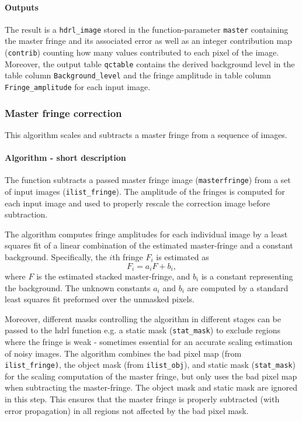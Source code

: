 \paragraph{Outputs}
\label{fringe:algorithms:compute:outputs}

The result is a \verb+hdrl_image+ stored in the function-parameter
\verb+master+ containing the master fringe and its associated error as
well as an integer contribution map (\verb+contrib+) counting how many
values contributed to each pixel of the image. Moreover, the output
table \verb+qctable+ contains the derived background level in the
table column \verb+Background_level+ and the fringe amplitude in table
column \verb+Fringe_amplitude+ for each input image.


\subsubsection{Master fringe correction}
\label{fringe:algorithms:correct}

This algorithm scales and subtracts a master fringe from a sequence of
images.

\paragraph{Algorithm - short description}
\label{fringe:algorithms:correct:short}

The function subtracts a passed master fringe image
(\verb,masterfringe,) from a set of input images
(\verb,ilist_fringe,). The amplitude of the fringes is computed for
each input image and used to properly rescale the correction image
before subtraction.

The algorithm computes fringe amplitudes for each individual image by
a least squares fit of a linear combination of the estimated
master-fringe and a constant background.  Specifically, the $i$th
fringe $F_i$ is estimated as
\begin{equation}
  F_{i} = a_{i}F + b_{i},
\end{equation}
where $F$ is the estimated stacked master-fringe, and $b_i$ is a
constant representing the background.  The unknown constants $a_i$ and
$b_i$ are computed by a standard least squares fit preformed over the
unmasked pixels.

Moreover, different masks controlling the algorithm in different
stages can be passed to the hdrl function e.g. a static mask
(\verb,stat_mask,) to exclude regions where the fringe is weak -
sometimes essential for an accurate scaling estimation of noisy
images. The algorithm combines the bad pixel map (from
\verb,ilist_fringe),, the object mask (from \verb,ilist_obj,), and
static mask (\verb,stat_mask,) for the scaling computation of the
master fringe, but only uses the bad pixel map when subtracting the
master-fringe. The object mask and static mask are ignored in this
step. This ensures that the master fringe is properly subtracted (with
error propagation) in all regions not affected by the bad pixel mask.

